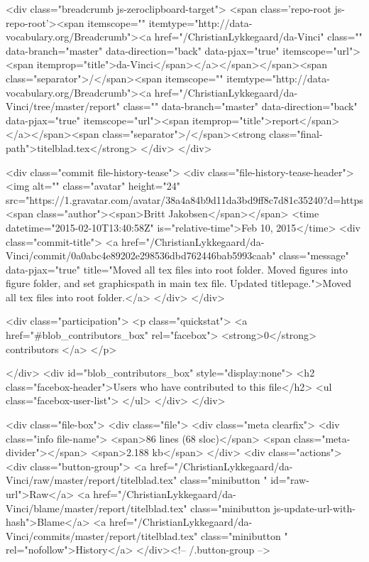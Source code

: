   <div class="breadcrumb js-zeroclipboard-target">
    <span class='repo-root js-repo-root'><span itemscope="" itemtype="http://data-vocabulary.org/Breadcrumb"><a href="/ChristianLykkegaard/da-Vinci" class="" data-branch="master" data-direction="back" data-pjax="true" itemscope="url"><span itemprop="title">da-Vinci</span></a></span></span><span class="separator">/</span><span itemscope="" itemtype="http://data-vocabulary.org/Breadcrumb"><a href="/ChristianLykkegaard/da-Vinci/tree/master/report" class="" data-branch="master" data-direction="back" data-pjax="true" itemscope="url"><span itemprop="title">report</span></a></span><span class="separator">/</span><strong class="final-path">titelblad.tex</strong>
  </div>
</div>


  <div class="commit file-history-tease">
    <div class="file-history-tease-header">
        <img alt="" class="avatar" height="24" src="https://1.gravatar.com/avatar/38a4a84b9d11da3bd9ff8c7d81c35240?d=https%
        <span class="author"><span>Britt Jakobsen</span></span>
        <time datetime="2015-02-10T13:40:58Z" is="relative-time">Feb 10, 2015</time>
        <div class="commit-title">
            <a href="/ChristianLykkegaard/da-Vinci/commit/0a0abc4e89202e298536dbd762446bab5993caab" class="message" data-pjax="true" title="Moved all tex files into root folder.
Moved figures into figure folder, and set graphicspath in main tex file.
Updated titlepage.">Moved all tex files into root folder.</a>
        </div>
    </div>

    <div class="participation">
      <p class="quickstat">
        <a href="#blob_contributors_box" rel="facebox">
          <strong>0</strong>
           contributors
        </a>
      </p>
      
    </div>
    <div id="blob_contributors_box" style="display:none">
      <h2 class="facebox-header">Users who have contributed to this file</h2>
      <ul class="facebox-user-list">
      </ul>
    </div>
  </div>

<div class="file-box">
  <div class="file">
    <div class="meta clearfix">
      <div class="info file-name">
          <span>86 lines (68 sloc)</span>
          <span class="meta-divider"></span>
        <span>2.188 kb</span>
      </div>
      <div class="actions">
        <div class="button-group">
          <a href="/ChristianLykkegaard/da-Vinci/raw/master/report/titelblad.tex" class="minibutton " id="raw-url">Raw</a>
            <a href="/ChristianLykkegaard/da-Vinci/blame/master/report/titelblad.tex" class="minibutton js-update-url-with-hash">Blame</a>
          <a href="/ChristianLykkegaard/da-Vinci/commits/master/report/titelblad.tex" class="minibutton " rel="nofollow">History</a>
        </div><!-- /.button-group -->


